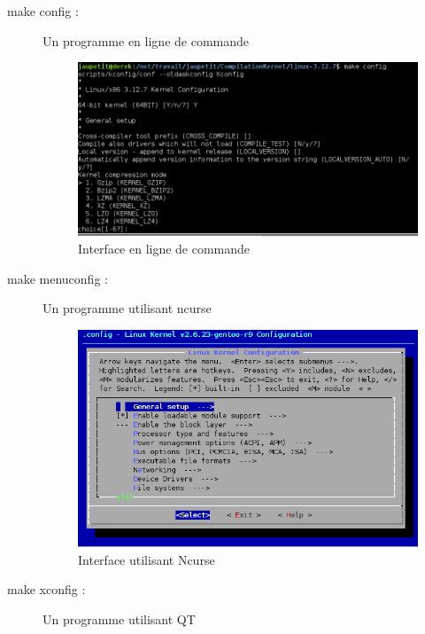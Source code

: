 \documentclass[17pts]{report}
\begin{document}
\begin{description}
\item[make config :]              Un programme en ligne de commande \\
        \begin{figure}[H]
            \includegraphics[scale=0.7]{illustrations/configLine.png}
            \centering
            \caption{Interface en ligne de commande}
            \label{fig:MakeConfig}
        \end{figure}
        \pagebreak
    \item[make menuconfig :]      Un programme utilisant ncurse \\
        \begin{figure}[H]
            \includegraphics[scale=0.7]{illustrations/menuconfig.png}
            \centering
            \caption{Interface utilisant Ncurse}
            \label{fig:MakeMenuConfig}
        \end{figure}
\item[make xconfig :]             Un programme utilisant QT \\

\end{description}
\end{document}
